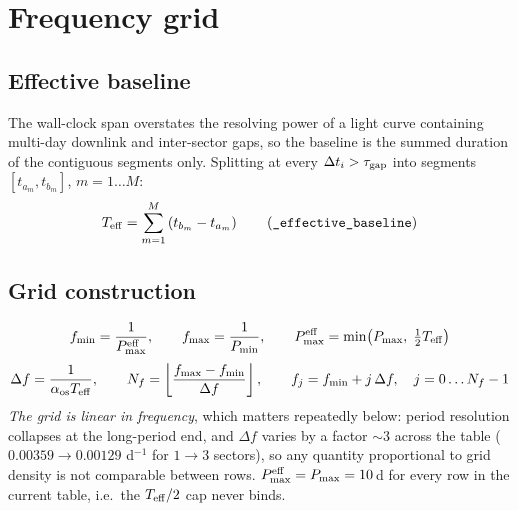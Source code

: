 \documentclass[11pt]{article}
\begin{document}
\section{Frequency grid}

\subsection{Effective baseline}

The wall-clock span overstates the resolving power of a light curve containing multi-day
downlink and inter-sector gaps, so the baseline is the summed duration of the contiguous
segments only. Splitting at every $\Delta t_i > \tau_{\rm gap}$ into segments
$[t_{a_m}, t_{b_m}]$, $m = 1 \ldots M$:
%
\begin{equation}
  T_{\rm eff} = \sum_{m=1}^{M}\left(t_{b_m} - t_{a_m}\right)
  \qquad\text{(\texttt{\_effective\_baseline})}
  \label{eq:teff}
\end{equation}

\subsection{Grid construction}

\begin{equation}
  f_{\min} = \frac{1}{P_{\max}^{\rm eff}}, \qquad
  f_{\max} = \frac{1}{P_{\min}}, \qquad
  P_{\max}^{\rm eff} = \min\!\left(P_{\max},\; \tfrac{1}{2}T_{\rm eff}\right)
  \label{eq:frange}
\end{equation}
%
\begin{equation}
  \Delta f = \frac{1}{\alpha_{\rm os} T_{\rm eff}}, \qquad
  N_f = \left\lfloor \frac{f_{\max}-f_{\min}}{\Delta f} \right\rfloor, \qquad
  f_j = f_{\min} + j\,\Delta f, \quad j = 0 \ldots N_f-1
  \label{eq:grid}
\end{equation}
%
\emph{The grid is linear in frequency}, which matters repeatedly below: period
resolution collapses at the long-period end, and $\Delta f$ varies by a factor $\sim 3$
across the table ($0.00359 \to 0.00129$ d$^{-1}$ for $1 \to 3$ sectors), so any
quantity proportional to grid density is not comparable between rows.
$P_{\max}^{\rm eff} = P_{\max} = 10$\,d for every row in the current table, i.e.\ the
$T_{\rm eff}/2$ cap never binds.

\end{document}
